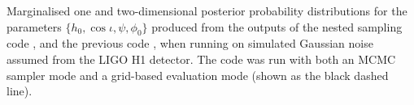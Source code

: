 \label{fig:simnoise_single}
Marginalised one and two-dimensional posterior probability distributions
for the parameters $\{h_0, \cos{\iota}, \psi, \phi_0\}$
produced from the outputs of the nested sampling code \lppen, and the previous
code \lppe, when running on simulated Gaussian noise assumed from the LIGO H1 detector. The \lppe code was run with both an MCMC sampler mode and a grid-based
evaluation mode (shown as the black dashed line).

